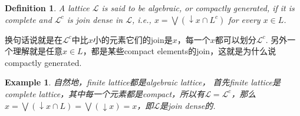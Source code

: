 \documentclass{article}
\newtheorem{example}[theorem]{Example}
\newtheorem{definition}[theorem]{Definition}
\newcommand\lattice{\mathcal{L}}
\begin{document}
\begin{definition}
\rm A lattice $\lattice$ is said to be {\color{red} algebraic, or compactly generated}, if it is complete and $\lattice^c$ is join dense in $\lattice$, i.e., $x = \bigvee (\downarrow x \cap L^c)$ for every $x \in L$.
\end{definition}

{\color{blue} 换句话说就是在$\lattice^c$中比$x$小的元素它们的join是$x$，每一个$x$都可以划分$\lattice^c$. 另外一个理解就是任意$x \in L$，都是某些compact elements的join，这就是为什么说compactly generated}.

\begin{example}
\rm 自然地，finite lattice都是algebraic lattice， 首先finite lattice是complete lattice，其中每一个元素都是compact，所以有$\lattice = \lattice ^c$，那么$x = \bigvee (\downarrow x \cap L) = \bigvee (\downarrow x) = x$，即$\lattice$是join dense的. 
\end{example} 
\end{document}

